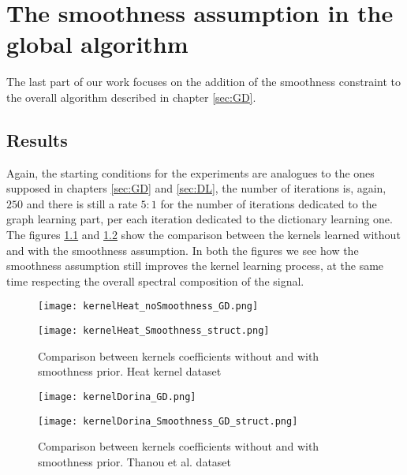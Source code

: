 \chapter{The smoothness assumption in the global algorithm}
The last part of our work focuses on the addition of the smoothness constraint to the overall algorithm described in chapter \ref{sec:GD}.
\section{Results}
Again, the starting conditions for the experiments are analogues to the ones supposed in chapters \ref{sec:GD} and \ref{sec:DL}, the number of iterations is, again, $250$ and there is still a rate $5:1$ for the number of iterations dedicated to the graph learning part, per each iteration dedicated to the dictionary learning one.
\\

The figures \ref{fig:alphaHeatGD_smth} and \ref{fig:alphaDorinaGD_smth} show the comparison between the kernels learned without and with the smoothness assumption. In both the figures we see how the smoothness assumption still improves the kernel learning process, at the same time respecting the overall spectral composition of the signal.

\begin{figure}
  \centering
  \begin{minipage}[c]{.8\textwidth}
    \centering
    \texttt{[image: kernelHeat\_noSmoothness\_GD.png]}
  \end{minipage}
  \begin{minipage}[c]{.8\textwidth}
    \centering
    \texttt{[image: kernelHeat\_Smoothness\_struct.png]}
  \end{minipage}
  \caption{Comparison between kernels coefficients without and with smoothness prior. Heat kernel dataset}
  \label{fig:alphaHeatGD_smth}
\end{figure}

\begin{figure}
  \centering
  \begin{minipage}[c]{.8\textwidth}
    \centering
    \texttt{[image: kernelDorina\_GD.png]}
  \end{minipage}
  \begin{minipage}[c]{.8\textwidth}
    \centering
    \texttt{[image: kernelDorina\_Smoothness\_GD\_struct.png]}
  \end{minipage}
  \caption{Comparison between kernels coefficients without and with smoothness prior. Thanou et al. dataset}
  \label{fig:alphaDorinaGD_smth}
\end{figure}

